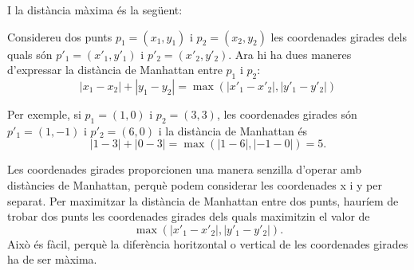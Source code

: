 \begin{center}
\end{center}
I la distància màxima és la següent:
\begin{center}
\end{center}


Considereu dos punts $p_1=(x_1,y_1)$ i $p_2=(x_2,y_2)$ les coordenades
girades dels quals són $p'_1=(x'_1,y'_1)$ i $p'_2=(x'_2, y'_2)$. Ara
hi ha dues maneres d'expressar la distància de Manhattan entre $p_1$ i
$p_2$:
\[|x_1-x_2|+|y_1-y_2| = \max(|x'_1-x'_2|,|y'_1-y'_2|)\]


Per exemple, si $p_1=(1,0)$ i $p_2=(3,3)$, les coordenades girades són
$p'_1=(1,-1)$ i $p'_2=(6,0 )$ i la distància de Manhattan és
\[|1-3|+|0-3| = \max(|1-6|,|-1-0|) = 5.\]


Les coordenades girades proporcionen una manera senzilla d'operar amb
distàncies de Manhattan, perquè podem considerar les coordenades x i y
per separat. Per maximitzar la distància de Manhattan entre dos punts,
hauríem de trobar dos punts les coordenades girades dels quals
maximitzin el valor de
\[\max(|x'_1-x'_2|,|y'_1-y'_2|).\]
Això és fàcil, perquè la diferència horitzontal o vertical de les
coordenades girades ha de ser màxima.


